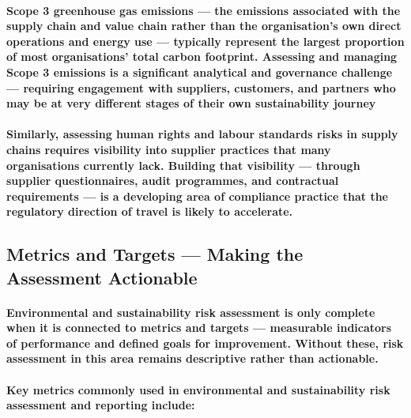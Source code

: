 \paragraph{\textbf{Scope 3 greenhouse gas emissions} — the emissions associated with the supply chain and value chain rather than the organisation's own direct operations and energy use — typically represent the largest proportion of most organisations' total carbon footprint. Assessing and managing Scope 3 emissions is a significant analytical and governance challenge — requiring engagement with suppliers, customers, and partners who may be at very different stages of their own sustainability journey}
\paragraph{Similarly, assessing human rights and labour standards risks in supply chains requires visibility into supplier practices that many organisations currently lack. Building that visibility — through supplier questionnaires, audit programmes, and contractual requirements — is a developing area of compliance practice that the regulatory direction of travel is likely to accelerate.}

\subsection{Metrics and Targets — Making the Assessment Actionable}
\paragraph{Environmental and sustainability risk assessment is only complete when it is connected to \textbf{metrics and targets} — measurable indicators of performance and defined goals for improvement. Without these, risk assessment in this area remains descriptive rather than actionable.}
\paragraph{Key metrics commonly used in environmental and sustainability risk assessment and reporting include:}
\begin{itemize}
\end{itemize}

